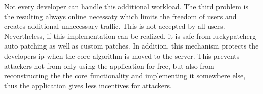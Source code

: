 Not every developer can handle this additional workload.
\newline
The third problem is the resulting always online necessaty which limits the freedom of users and creates additional unnecessary traffic.
This is not accepted by all users.
\newline
\newline
Nevertheless, if this implementation can be realized, it is safe from \gls{luckypatcherg} auto patching as well as custom patches.
In addition, this mechanism protects the developers \gls{ip} when the core algorithm is moved to the server.
This prevents attackers not from only using the application for free, but also from reconstructing the the core functionality and implementing it somewhere else, thus the application gives less incentives for attackers.
